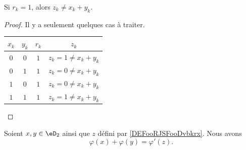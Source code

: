 \begin{lemma}	\label{LEMooIUDHooNDlVtg}
	Si \( r_k=1\), alors \( z_k\neq x_k+y_k\).
\end{lemma}

\begin{proof}
	Il y a seulement quelques cas à traiter.
	\begin{center}
		\begin{tabular}{c|c|c|c}
			\( x_k\) & \( y_k\) & \( r_k\) & \( z_k\)               \\
			\hline
			\( 0\)   & \( 0\)   & \( 1\)   & \( z_k=1\neq x_k+y_k\) \\
			\hline
			\( 0\)   & \( 1\)   & \( 1\)   & \( z_k=0\neq x_k+y_k\) \\
			\hline
			\( 1\)   & \( 0\)   & \( 1\)   & \( z_k=0\neq x_k+y_k\) \\
			\hline
			\( 1\)   & \( 1\)   & \( 1\)   & \( z_k=1\neq x_k+y_k\) \\
		\end{tabular}
	\end{center}
\end{proof}


\begin{proposition}	\label{PROPooGHPZooEwXqMH}
	Soient \( x,y\in \eD_2\) ainsi que \( z\) défini par \ref{DEFooRJSFooDvbkrx}. Nous avons
	\begin{equation}
		\varphi(x)+\varphi(y)=\varphi'(z).
	\end{equation}
\end{proposition}

